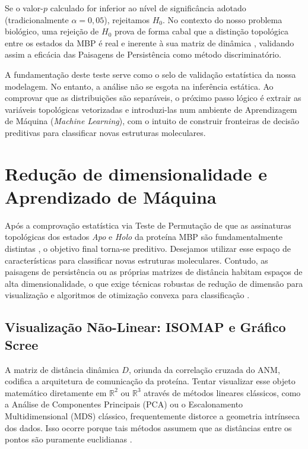 \documentclass[12pt, a4paper]{article}
\theoremstyle{plain}
\theoremstyle{definition}
\theoremstyle{remark}
\newcommand{\ident}{\hspace{2em}}
\begin{document}
\ident Se o valor-$p$ calculado for inferior ao nível de significância adotado (tradicionalmente $\alpha = 0,05$), rejeitamos $H_0$. No contexto do nosso problema biológico, uma rejeição de $H_0$ prova de forma cabal que a distinção topológica entre os estados da MBP é real e inerente à sua matriz de dinâmica \cite{kovacev2016}, validando assim a eficácia das Paisagens de Persistência como método discriminatório.

\ident A fundamentação deste teste serve como o selo de validação estatística da nossa modelagem. No entanto, a análise não se esgota na inferência estática. Ao comprovar que as distribuições são separáveis, o próximo passo lógico é extrair as variáveis topológicas vetorizadas e introduzi-las num ambiente de Aprendizagem de Máquina (\textit{Machine Learning}), com o intuito de construir fronteiras de decisão preditivas para classificar novas estruturas moleculares.

\section{Redução de dimensionalidade e Aprendizado de Máquina}

\ident Após a comprovação estatística via Teste de Permutação de que as assinaturas topológicas dos estados \textit{Apo} e \textit{Holo} da proteína MBP são fundamentalmente distintas \cite{kovacev2016}, o objetivo final torna-se preditivo. Desejamos utilizar esse espaço de características para classificar novas estruturas moleculares. Contudo, as paisagens de persistência ou as próprias matrizes de distância habitam espaços de alta dimensionalidade, o que exige técnicas robustas de redução de dimensão para visualização e algoritmos de otimização convexa para classificação \cite{lorena2007}.

\subsection{Visualização Não-Linear: ISOMAP e Gráfico Scree} \label{sec:isomap}

\ident A matriz de distância dinâmica $D$, oriunda da correlação cruzada do ANM, codifica a arquitetura de comunicação da proteína. Tentar visualizar esse objeto matemático diretamente em $\mathbb{R}^2$ ou $\mathbb{R}^3$ através de métodos lineares clássicos, como a Análise de Componentes Principais (PCA) ou o Escalonamento Multidimensional (MDS) clássico, frequentemente distorce a geometria intrínseca dos dados. Isso ocorre porque tais métodos assumem que as distâncias entre os pontos são puramente euclidianas \cite{Tenenbaum2000}.
\end{document}
